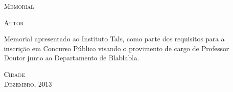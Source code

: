 
\begin{center}
\vspace{1.5cm}
{\Huge \scshape
Memorial
}
\end{center}

\vspace{5.0cm}

\begin{center}
\scshape
 \Huge Autor
\end{center}

\vspace{5.0cm}

\hfill
\parbox{.60\textwidth}{
\large Memorial apresentado ao Instituto Tals, como parte dos requisitos para a inscrição em Concurso Público visando o provimento de cargo de Professor Doutor junto ao Departamento de Blablabla.
}



\vfill

\begin{center}
 {\large {\scshape Cidade \\ Dezembro, 2013}}
\end{center}



\newpage
\mbox{}
\newpage
